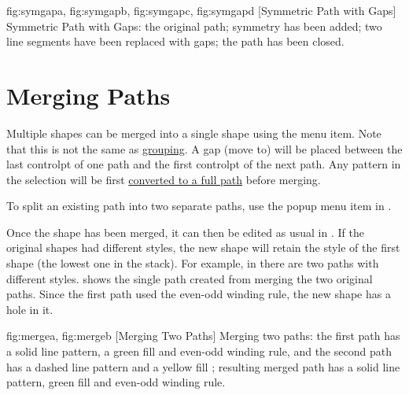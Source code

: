 {
  {fig:symgapa}{}{},
  {fig:symgapb}{}{},
  {fig:symgapc}{}{},
  {fig:symgapd}{}{}
}
[Symmetric Path with Gaps]
{Symmetric Path with Gaps:
 the original path;
 symmetry has been added;
 two line segments have been replaced with gaps;
 the path has been closed.}


\section{Merging Paths}\label{sec:mergepaths}


Multiple \glspl{shape} can be merged into a single \gls*{shape}
using the  menu item. Note that this is not
the same as \hyperref[sec:grouping]{grouping}.  A \gls{gap} (move
to) will be placed between the last \gls{controlpt} of one path and
the first \gls*{controlpt} of the next path. Any \gls{pattern} in
the selection will be first \hyperref[sec:converttofullpath]{converted
to a full path} before merging.

\begin{information}
To split an existing \gls{path} into two separate \glspl{path}, use the
 popup menu item in \editpathmode.
\end{information}

Once the shape has been merged, it can then be edited as usual in
\editpathmode.  If the original shapes had different styles, the new
shape will retain the style of the first shape (the lowest one in
the \gls{stack}). For example, in  there are
two \glspl{path} with different styles.  shows
the single \gls{path} created from merging the two original paths.
Since the first path used the even-odd winding rule, the new shape
has a hole in it.

{
  {fig:mergea}{}{},
  {fig:mergeb}{}{}
}
[Merging Two Paths]
{Merging two paths:
 the first path has a solid line pattern, a
green fill  and even-odd winding rule, and the second
path has a dashed line pattern and a yellow fill ;
 resulting merged path has a solid line
pattern, green fill  and even-odd winding rule.}

